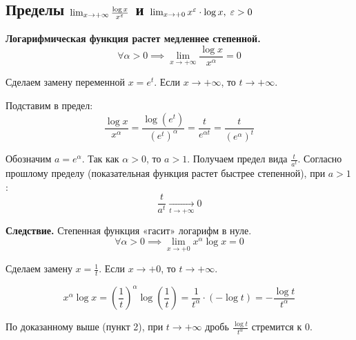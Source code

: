 \subsection{Пределы $\lim_{x\to +\infty} \frac{\log x}{x^\varepsilon}$ и $\lim_{x\to +0} x^\varepsilon\cdot \log x,\; \varepsilon > 0$}

\textbf{Логарифмическая функция растет медленнее степенной.}
\[ \forall \alpha > 0 \implies \lim_{x \to +\infty} \frac{\log x}{x^\alpha} = 0 \]

\begin{tcolorbox}[title=Доказательство]
	Сделаем замену переменной $x = e^t$.
	Если $x \to +\infty$, то $t \to +\infty$.
	
	Подставим в предел:
	\[ \frac{\log x}{x^\alpha} = \frac{\log(e^t)}{(e^t)^\alpha} = \frac{t}{e^{\alpha t}} = \frac{t}{(e^\alpha)^t} \]
	
	Обозначим $a = e^\alpha$. Так как $\alpha > 0$, то $a > 1$.
	Получаем предел вида $\frac{t}{a^t}$.
	Согласно прошлому пределу (показательная функция растет быстрее степенной), при $a > 1$:
	\[ \frac{t}{a^t} \xrightarrow[t \to +\infty]{} 0 \]
\end{tcolorbox}

\textbf{Следствие.} Степенная функция «гасит» логарифм в нуле.
\[ \forall \alpha > 0 \implies \lim_{x \to +0} x^\alpha \log x = 0 \]

\begin{tcolorbox}[title=Доказательство]
	Сделаем замену $x = \frac{1}{t}$.
	Если $x \to +0$, то $t \to +\infty$.
	
	\[ x^\alpha \log x = \left(\frac{1}{t}\right)^\alpha \log\left(\frac{1}{t}\right) = \frac{1}{t^\alpha} \cdot (-\log t) = - \frac{\log t}{t^\alpha} \]
	
	По доказанному выше (пункт 2), при $t \to +\infty$ дробь $\frac{\log t}{t^\alpha}$ стремится к 0.
\end{tcolorbox}
